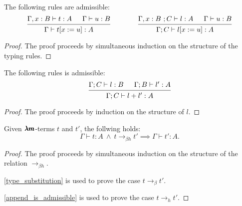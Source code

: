 
\begin{lemma}
  \label{type_substitution}
  The following rules are admissible:
  \[
    \begin{prooftree}
      \hypo{ \Gamma , x:B \vdash t:A }
      \hypo{ \Gamma \vdash u:B }
      \infer2{ \Gamma \vdash  t[x := u] : A }      
    \end{prooftree}
    \qquad \qquad
    \begin{prooftree}
      \hypo{ \Gamma , x:B \ ; C \vdash l:A }
      \hypo{ \Gamma \vdash u:B }
      \infer2{ \Gamma ; C \vdash  l[x := u] : A }
    \end{prooftree}
  \]
\end{lemma}
\begin{proof}
  The proof proceeds by simultaneous induction on the structure of the typing rules.
\end{proof}


\begin{lemma}
  \label{append_is_admissible}
  The following rules is admissible:
  \[
    \begin{prooftree}
      \hypo{ \Gamma ; C \vdash l:B }
      \hypo{ \Gamma ; B \vdash l':A }
      \infer2{ \Gamma ; C \vdash  l+l' : A }
    \end{prooftree}
  \]
\end{lemma}
\begin{proof}
  The proof proceeds by induction on the structure of $l$.
\end{proof}


\begin{theorem}
  \label{type_preservation}
  Given $\pmb{\lambda m}$-terms $t$ and $t'$, the follwing holds:
  \[
    \Gamma \vdash t : A \ \land \ t \to_{\beta h} t' \implies \Gamma \vdash t' : A.
  \]
\end{theorem}
\begin{proof}
  The proof proceeds by simultaneous induction on the structure of the relation $\to_{\beta h}$.

  \cref{type_substitution} is used to prove the case $t \to_\beta t'$.

  \cref{append_is_admissible} is used to prove the case $t \to_h t'$.
\end{proof}

